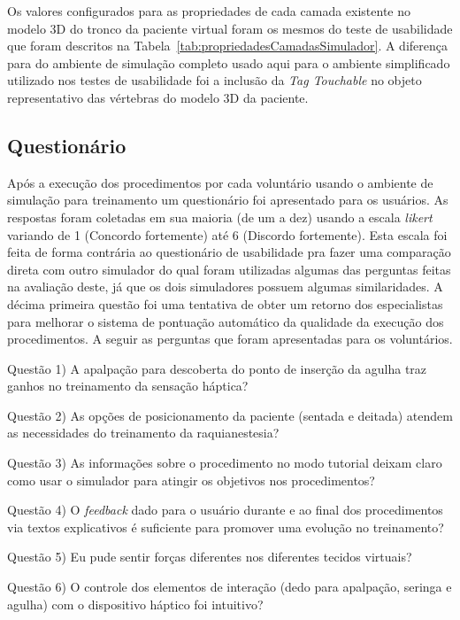 Os valores configurados para as propriedades de cada camada existente no modelo 3D do tronco da paciente virtual foram os mesmos do teste de usabilidade que foram descritos na Tabela~\ref{tab:propriedadesCamadasSimulador}. A diferença para do ambiente de simulação completo usado aqui para o ambiente simplificado utilizado nos testes de usabilidade foi a inclusão da \textit{Tag Touchable} no objeto representativo das vértebras do modelo 3D da paciente. 

\subsection{Questionário}
\label{sec:questionarioEspecialistas}

Após a execução dos procedimentos por cada voluntário usando o ambiente de simulação para treinamento um questionário foi apresentado para os usuários. As respostas foram coletadas em sua maioria (de um a dez) usando a escala \textit{likert} \cite{Norman2010} variando de 1 (Concordo fortemente) até 6 (Discordo fortemente). Esta escala foi feita de forma contrária ao questionário de usabilidade pra fazer uma comparação direta com outro simulador \cite{Farber2009} do qual foram utilizadas algumas das perguntas feitas na avaliação deste, já que os dois simuladores possuem algumas similaridades. A décima primeira questão foi uma tentativa de obter um retorno dos especialistas para melhorar o sistema de pontuação automático da qualidade da execução dos procedimentos. A seguir as perguntas que foram apresentadas para os voluntários.

Questão 1) A apalpação para descoberta do ponto de inserção da agulha traz ganhos no treinamento da sensação háptica?

Questão 2) As opções de posicionamento da paciente (sentada e deitada) atendem as necessidades do treinamento da raquianestesia?

Questão 3) As informações sobre o procedimento no modo tutorial deixam claro como usar o simulador para atingir os objetivos nos procedimentos?

Questão 4) O \textit{feedback} dado para o usuário durante e ao final dos procedimentos via textos explicativos é suficiente para promover uma evolução no treinamento?

Questão 5) Eu pude sentir forças diferentes nos diferentes tecidos virtuais?

Questão 6) O controle dos elementos de interação (dedo para apalpação, seringa e agulha) com o dispositivo háptico foi intuitivo?

